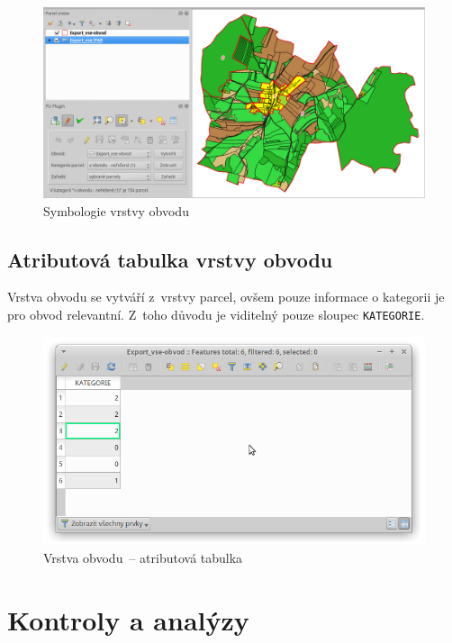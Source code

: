 	\begin{figure}[H]
		\centering
		\includegraphics[width=1.0\textwidth]{./pictures/symbologie_obvod.png}
		\caption[Symbologie vrstvy obvodu]{Symbologie vrstvy obvodu}
		\label{fig:manual_symbologie_obvod}
 	\end{figure}

\subsection{Atributová tabulka vrstvy obvodu}
\label{manual_editace_tabulka}

Vrstva obvodu se vytváří z~vrstvy parcel, ovšem pouze informace o kategorii je pro obvod relevantní. Z~toho důvodu je viditelný pouze sloupec \texttt{KATEGORIE}.

	\begin{figure}[H]
		\centering
		\includegraphics[width=.7\textwidth]{./pictures/editace-tabulka.png}
		\caption[Vrstva obvodu~– atributová tabulka]{Vrstva obvodu~– atributová tabulka}
		\label{fig:manual_tabulka_obvod}
 	\end{figure}

\newpage

\section{Kontroly a analýzy}
\label{manual_kontroly_analyzy}

